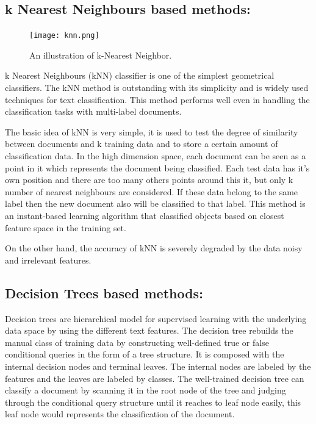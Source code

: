 \documentclass[senior]{IPSstyle}
\begin{document}
\subsection{k Nearest Neighbours based methods:}

\begin{figure}[t]
  \centering
  \texttt{[image: knn.png]}\\
  \caption{An illustration of k-Nearest Neighbor.}\label{NBde}
\end{figure}

k Nearest Neighbours (kNN) classifier is one of the simplest geometrical classifiers\cite{kwon2003text}.  The  kNN  method  is  outstanding  with  its  simplicity and is widely used techniques for text classification.  This  method  performs  well  even  in  handling  the classification   tasks   with   multi-label   documents.   

The basic idea of kNN is very simple, it  is used  to  test  the  degree  of  similarity  between  documents  and  k   training  data  and  to  store  a  certain  amount  of  classification  data. In the high dimension space, each document can be seen as a point in it which represents the document being classified. Each test data has it's own position and there are too many others points around this it, but only k number of nearest neighbours are considered. If these data belong to the same label then the new document also will be classified to that label. This method is an instant-based learning algorithm that classified objects based on closest feature space in the  training  set.

On the other hand, the accuracy of kNN  is  severely  degraded  by  the  data noisy  and  irrelevant features. 



\subsection{Decision Trees based methods:}

Decision trees are hierarchical model for supervised learning with the underlying data space by using the different text features. The  decision  tree  rebuilds  the  manual  class  of  training     data     by     constructing     well-defined   true or false conditional queries in the form of a tree structure. It is composed with the internal decision nodes and terminal leaves. The internal nodes are labeled by the features and the leaves are labeled by classes.  The well-trained decision tree can  classify a document by  scanning it in the root node of the tree and judging through 
the  conditional query  structure  until  it  reaches  to leaf node easily,  this leaf node would   represents the classification of the document. 
\end{document}
